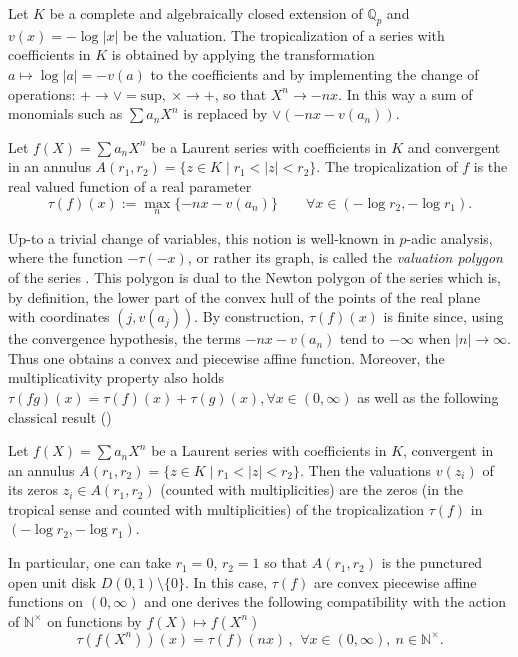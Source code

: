 \documentclass[graybox, envcountsect%
]{svmult}
\def\N{{\mathbb N}}
\def\Q{{\mathbb Q}}
\def\qqq{\,,\,~\forall}
\def\no{\noindent}
\def\nt{\N^{\times}}
\begin{document}
Let $K$ be a complete and algebraically closed extension of $\Q_p$ and  $v(x)=-\log\vert x \vert$ be the valuation. The tropicalization of a series with coefficients in $K$   is obtained by applying the transformation $a\mapsto \log\vert a \vert=-v(a)$ to the coefficients and by implementing the change of operations:
$
+ \rightarrow \vee=\text{sup} ,~\times \rightarrow +$, so that $ X^n\rightarrow -nx.
$
In this way a sum of monomials such as $\sum a_n X^n$ is replaced by $\vee (-nx-v(a_n))$. 
\begin{definition}\label{defntropna}  Let $f(X)=\sum a_n X^n$ be a  Laurent  series with coefficients in $K$ and convergent in an annulus  $A(r_1,r_2)= \{z\in K\mid r_1<\vert z\vert <r_2\}$.  The tropicalization  of $f$ is the real valued function of a real parameter
\begin{equation}\label{tropicalization4}
\tau(f)(x):= \max_n\{-nx -v(a_n) \}\qquad \forall x\in (-\log r_2, -\log r_1).
\end{equation}	
\end{definition}
\no Up-to a trivial change of variables, this notion is well-known in $p$-adic analysis, where the function $-\tau(-x)$, or rather its graph, is called the {\em  valuation polygon} of the series \cite{Robert}. 
 This polygon is dual to the Newton polygon of the series which is, by definition, the lower part of the convex hull of the points of the real plane with coordinates $(j,v(a_j))$. By construction, $\tau(f)(x)$ is finite since, using the convergence hypothesis, the terms $-nx -v(a_n)$ tend to $-\infty$ when $\vert n\vert\to \infty$. Thus one obtains a  convex and piecewise affine function. Moreover, the multiplicativity property also holds
$
\tau(fg)(x)=\tau(f)(x)+\tau(g)(x), \forall x\in (0, \infty)$
as well as the following classical result (\cite{Robert})

 \begin{theorem}\label{classical} Let $f(X)=\sum a_n X^n$ be a  Laurent  series with coefficients in $K$, convergent in an annulus  $A(r_1,r_2)= \{z\in K\mid r_1<\vert z\vert <r_2\}$.  	Then the valuations $v(z_i)$ of its zeros $z_i\in A(r_1,r_2)$ (counted with multiplicities) are the zeros (in the tropical sense and counted with multiplicities) of the tropicalization $\tau(f)$ in $(-\log r_2, -\log r_1)$.
\end{theorem}
In particular, one can take $r_1=0$, $r_2=1$ so that $A(r_1,r_2)$ is the punctured open unit  disk $D(0,1)\setminus \{0\}$. In this case,  $\tau(f)$ are convex piecewise affine functions on $(0,\infty)$ and one derives the following compatibility with the action of $\nt$ on functions by $f(X)\mapsto f(X^n)$ 
\begin{equation}\label{tropicalizationscal}
\tau(f(X^n))(x)=\tau(f)(nx)\qqq x\in (0, \infty),\ n\in \nt.
\end{equation}
\end{document}
